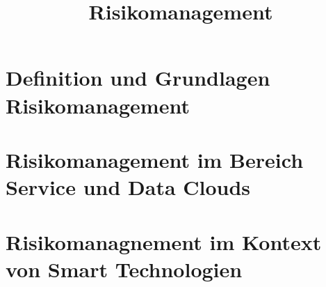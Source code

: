 \documentclass{report}
\begin{document}
\pagestyle{plain}

\title{Risikomanagement}


\maketitle

\tableofcontents
\newpage


\chapter{Definition und Grundlagen Risikomanagement}
\label{sect:grundlagen}






\chapter{Risikomanagement im Bereich Service und Data Clouds}
\label{sect:clouds}



\chapter{Risikomanagnement im Kontext von Smart Technologien}
\label{sect:relevance}




\end{document}

